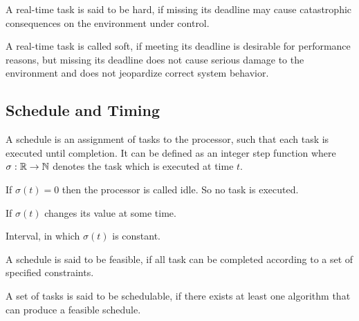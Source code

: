 \begin{definition}[Hard]
A real-time task is said to be hard, if missing its 
deadline may cause catastrophic consequences on the 
environment under control.
\end{definition}

\begin{definition}[Soft]
A real-time task is called soft, if meeting its deadline is 
desirable for performance reasons, but missing its deadline 
does not cause serious damage to the environment and does 
not jeopardize correct system behavior.
\end{definition}



\subsection{Schedule and Timing}


\begin{definition}[Schedule]
A schedule is an assignment of tasks to the processor, such 
that each task is executed until completion. It can be defined as an integer step function
where $ \sigma : \mathbb{R} \rightarrow \mathbb{N} $ denotes the task which is executed at time $t$. 
\end{definition}

\begin{definition}[Idle]
If $ \sigma (t) = 0$ then the processor is called idle. So no task is executed.
\end{definition}

\begin{definition}
If $\sigma (t) $ changes its value at some time.
\end{definition}

\begin{definition}
Interval, in which $\sigma (t) $ is constant.
\end{definition}

\begin{definition}[Feasible]
A schedule is said to be feasible, if all task can be completed 
according to a set of specified constraints.
\end{definition}

\begin{definition}[schedulable]
A set of tasks is said to be schedulable, if there exists at 
least one algorithm that can produce a feasible schedule.
\end{definition}


